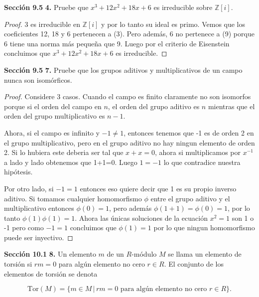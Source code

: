 \documentclass[letter,twoside,12pt]{article}
\begin{document}
\textbf{Sección 9.5} \textbf{4.}  Pruebe que $ x^3 +12x^2+18x+6$ es irreducible sobre $ \mathbb{Z}[i] $.

\begin{proof}
3 es irreducible en $ \mathbb{Z}[i] $ y por lo tanto su ideal es primo. Vemos que los coeficientes 12, 18 y 6 pertenecen a (3). Pero además, 6 no pertenece a (9) porque 6 tiene una norma más pequeña que 9. Luego por el criterio de Eisenstein concluimos que $ x^3+12x^2+18x+6 $ es irreducible. 
\end{proof}
\textbf{Sección 9.5} \textbf{7.} Pruebe que los grupos aditivos y multiplicativos de un campo nunca son isomórficos.

\begin{proof}
Considere 3 casos. Cuando el campo es finito claramente no son isomorfos porque si el orden del campo en $ n $, el orden del grupo aditivo es $ n $ mientras que el orden del grupo multiplicativo es $ n-1 $. 

Ahora, si el campo es infinito y $ -1 \not = 1 $, entonces tenemos que -1 es de orden 2 en el grupo multiplicativo, pero en el grupo aditivo no hay ningun elemento de orden 2. Si lo hubiera este deberia ser tal que $ x+x = 0 $, ahora si multiplicamos por $ x^{-1} $ a lado y lado obtenemos que 1+1=0. Luego $ 1 = -1 $ lo que contradice nuestra hipótesis.

Por otro lado, si $ -1 = 1 $ entonces eso quiere decir que 1 es su propio inverso aditivo.
Si tomamos cualquier homomorfismo $ \phi $ entre el grupo aditivo y el multiplicativo entonces $ \phi(0)=1 $, pero además $ \phi(1+1)=\phi(0)=1 $, por lo tanto $ \phi(1)\phi(1)=1 $. Ahora las únicas soluciones de la ecuación $ x^2 = 1 $ son 1 o -1 pero como $ -1 = 1 $ concluimos que $ \phi(1)=1 $ por lo que ningun homomorfismo puede ser inyectivo.
\end{proof}

\textbf{Sección 10.1} \textbf{8.} Un elemento $ m $ de un $ R$-módulo $ M $ se llama un elemento de torsión si $ rm=0 $ para algún elemento no cero $ r \in R $. El conjunto de los elementos de torsión se denota

\begin{equation}
\text{Tor}(M)=\{m \in M \,|\,rm = 0 \text{ para algún elemento no cero } r \in R \}.\nonumber
\end{equation}
\end{document}
